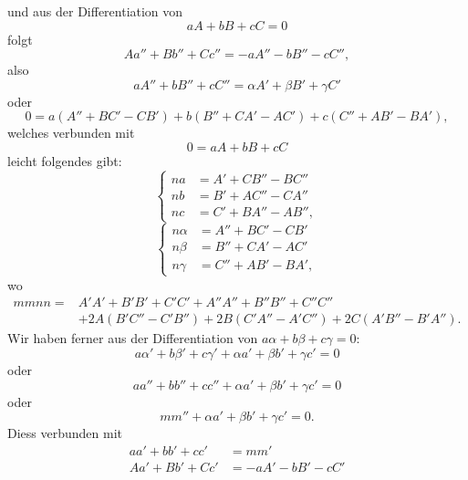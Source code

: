 %
\noindent und aus der Differentiation von
\[
aA+bB+cC=0
\]
folgt
\[
Aa''+Bb''+Cc''=-aA''-bB''-cC'',
\]
also
\[
aA''+bB''+cC''=\alpha A'+\beta B'+\gamma C'
\]
oder
\[
0=a(A''+BC'-CB')+b(B''+CA'-AC')+c(C''+AB'-BA'),
\]
welches verbunden mit
\[
0=aA+bB+cC
\]
leicht folgendes gibt:
\begin{equation}\tag*{[12]}
\left\{\begin{aligned}
na&=A'+CB''-BC''\\
nb&=B'+AC''-CA''\\
nc&=C'+BA''-AB'',
\end{aligned}\right.
\end{equation}
\begin{equation}\tag*{[13]}
\left\{\begin{aligned}
n\alpha&=A''+BC'-CB'\\
n\beta&=B''+CA'-AC'\\
n\gamma&=C''+AB'-BA',
\end{aligned}\right.
\end{equation}
wo
\begin{equation}\tag*{[14]}
\begin{aligned}
mmnn={}&A'A'+B'B'+C'C'+A''A''+B''B''+C''C''\\
&+2A(B'C''-C'B'')+2B(C'A''-A'C'')+2C(A'B''-B'A'').
\end{aligned}
\end{equation}
\indent Wir haben ferner aus der Differentiation von $a\alpha+b\beta+c\gamma=0$:
\[
a\alpha'+b\beta'+c\gamma'+\alpha a'+\beta b'+\gamma c'=0
\]
oder
\[
aa''+bb''+cc''+\alpha a'+\beta b'+\gamma c'=0
\]
oder
\[
mm''+\alpha a'+\beta b'+\gamma c'=0.
\]
Diess verbunden mit
\[
\begin{aligned}
aa'+bb'+cc'&=mm'\\
Aa'+Bb'+Cc'&=-aA'-bB'-cC'
\end{aligned}
\]
